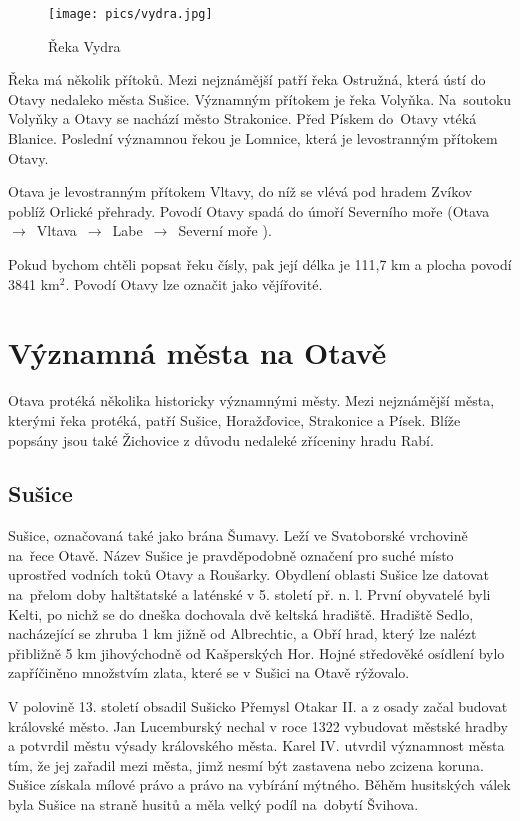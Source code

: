 \documentclass[thesis=M,czech]{FITthesis}[2012/06/26]
\begin{document}
\begin{figure}[h!]
	\centering
	\texttt{[image: pics/vydra.jpg]}
	\caption{Řeka Vydra}
	\label{obrazek:ot1}
\end{figure}

Řeka má několik přítoků. Mezi nejznámější patří řeka Ostružná, která ústí do Otavy nedaleko města Sušice. Významným přítokem je řeka Volyňka. Na~soutoku Volyňky a Otavy se nachází město Strakonice. Před Pískem do~Otavy vtéká Blanice. Poslední významnou řekou je Lomnice, která je levostranným přítokem Otavy. 

Otava je levostranným přítokem Vltavy, do níž se vlévá pod hradem Zvíkov poblíž Orlické přehrady. Povodí Otavy spadá do úmoří Severního moře (Otava~$\rightarrow$~Vltava~$\rightarrow$~Labe~$\rightarrow$~Severní moře ). 

Pokud bychom chtěli popsat řeku čísly, pak její délka je 111,7 km a plocha povodí 3841 km$^2$. Povodí Otavy lze označit jako vějířovité. 

\clearpage

\section{Významná města na Otavě}
Otava protéká několika historicky významnými městy. Mezi nejznámější města, kterými řeka protéká, patří Sušice, Horažďovice, Strakonice a Písek. Blíže popsány jsou také Žichovice z důvodu nedaleké zříceniny hradu Rabí.

\subsection{Sušice}
Sušice, označovaná také jako brána Šumavy. Leží ve Svatoborské vrchovině na~řece Otavě. Název Sušice je pravděpodobně označení pro suché místo uprostřed vodních toků Otavy a Roušarky. Obydlení oblasti Sušice lze datovat na~přelom doby haltštatské a laténské v 5. století př. n. l. První obyvatelé byli Kelti, po nichž se do dneška dochovala dvě keltská hradiště. Hradiště Sedlo, nacházející se zhruba 1 km jižně od Albrechtic, a Obří hrad, který lze nalézt přibližně 5 km jihovýchodně od Kašperských Hor. Hojné středověké osídlení bylo zapříčiněno množstvím zlata, které se v Sušici na Otavě rýžovalo. 

V polovině 13. století obsadil Sušicko Přemysl Otakar II. a z osady začal budovat královské město. Jan Lucemburský nechal v roce 1322 vybudovat městské hradby a potvrdil městu výsady královského města. Karel IV. utvrdil významnost města tím, že jej zařadil mezi města, jimž nesmí být zastavena nebo zcizena koruna. Sušice získala mílové právo a právo na vybírání mýtného. Běhěm husitských válek byla Sušice na straně husitů a měla velký podíl na~dobytí Švihova. 
\end{document}
